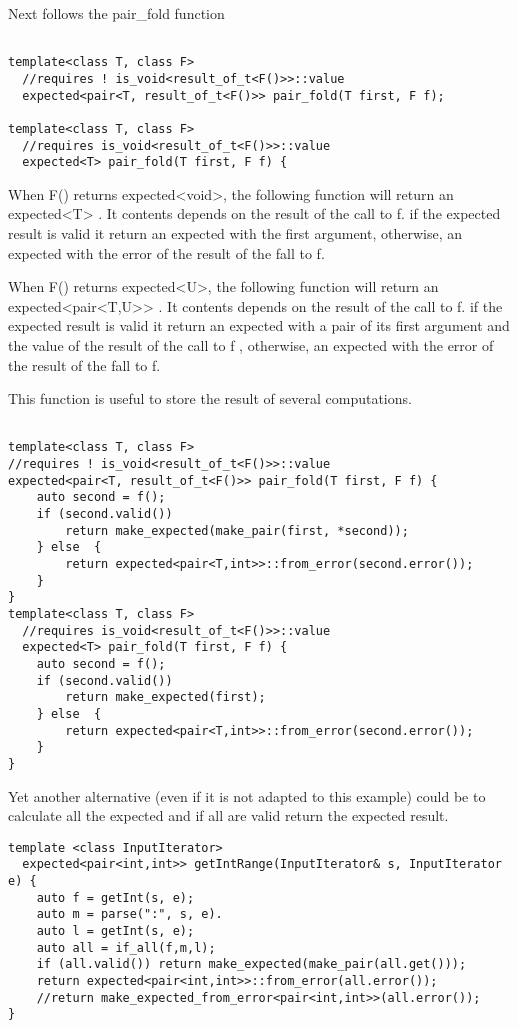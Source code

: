 \documentclass[a4paper,10pt]{article}
\begin{document}
Next follows the pair_fold function

\begin{lstlisting}

template<class T, class F>
  //requires ! is_void<result_of_t<F()>>::value
  expected<pair<T, result_of_t<F()>> pair_fold(T first, F f);

template<class T, class F>
  //requires is_void<result_of_t<F()>>::value
  expected<T> pair_fold(T first, F f) {
\end{lstlisting}

When F() returns expected<void>, the following function will return an expected<T> . It contents depends on the result of the call to f. if the expected result is valid it return an expected with the first argument, otherwise, an expected with the error of the result of the fall to f.  

When F() returns expected<U>, the following function will return an expected<pair<T,U>> . It contents depends on the result of the call to f. if the expected result is valid it return an expected with a pair of its first argument and the value of  the result of the call to f , otherwise, an expected with the error of the result of the fall to f.  

This function is useful to store the result of several computations.

\begin{lstlisting}

template<class T, class F>
//requires ! is_void<result_of_t<F()>>::value
expected<pair<T, result_of_t<F()>> pair_fold(T first, F f) {
    auto second = f();
    if (second.valid())
        return make_expected(make_pair(first, *second));
    } else  {
        return expected<pair<T,int>>::from_error(second.error());
    }
}
template<class T, class F>
  //requires is_void<result_of_t<F()>>::value
  expected<T> pair_fold(T first, F f) {
    auto second = f();
    if (second.valid())
        return make_expected(first);
    } else  {
        return expected<pair<T,int>>::from_error(second.error());
    }
}
\end{lstlisting}

Yet another alternative (even if it is not adapted to this example) could be to calculate all the expected and if all are valid return the expected result.

\begin{lstlisting}
template <class InputIterator>
  expected<pair<int,int>> getIntRange(InputIterator& s, InputIterator e) {
    auto f = getInt(s, e);
    auto m = parse(":", s, e).
    auto l = getInt(s, e);
    auto all = if_all(f,m,l);
    if (all.valid()) return make_expected(make_pair(all.get()));
    return expected<pair<int,int>>::from_error(all.error());
    //return make_expected_from_error<pair<int,int>>(all.error());
}
\end{lstlisting}
\end{document}
